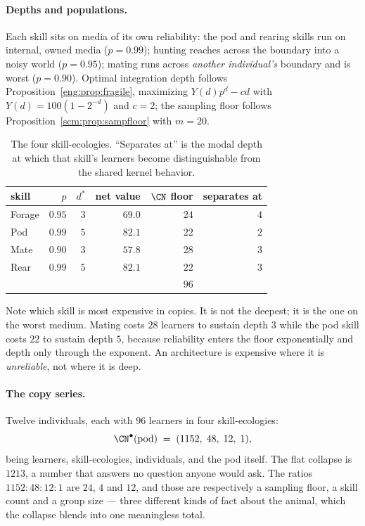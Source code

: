 \paragraph{Depths and populations.}
Each skill sits on media of its own reliability: the pod and rearing
skills run on internal, owned media ($p = 0.99$); hunting reaches across
the boundary into a noisy world ($p = 0.95$); mating runs across
\emph{another individual's} boundary and is worst ($p = 0.90$). Optimal
integration depth follows Proposition~\ref{eng:prop:fragile}, maximizing
$Y(d)p^{d} - cd$ with $Y(d) = 100(1-2^{-d})$ and $c = 2$; the sampling
floor follows Proposition~\ref{scm:prop:sampfloor} with $m = 20$.

\begin{table}[h]
\centering
\begin{tabular}{lrrrrr}
\toprule
skill & $p$ & $d^\ast$ & net value & $\CN$ floor & separates at \\
\midrule
Forage & $0.95$ & $3$ & $69.0$ & $24$ & $4$ \\
Pod    & $0.99$ & $5$ & $82.1$ & $22$ & $2$ \\
Mate   & $0.90$ & $3$ & $57.8$ & $28$ & $3$ \\
Rear   & $0.99$ & $5$ & $82.1$ & $22$ & $3$ \\
\midrule
       &        &     &        & $96$ & \\
\bottomrule
\end{tabular}
\caption{The four skill-ecologies. ``Separates at'' is the modal depth at
which that skill's learners become distinguishable from the shared kernel
behavior.}
\label{scm:tab:skills}
\end{table}

Note which skill is most expensive in copies. It is not the deepest; it is
the one on the worst medium. Mating costs $28$ learners to sustain depth
$3$ while the pod skill costs $22$ to sustain depth $5$, because
reliability enters the floor exponentially and depth only through the
exponent. An architecture is expensive where it is \emph{unreliable}, not
where it is deep.

\paragraph{The copy series.}
Twelve individuals, each with $96$ learners in four skill-ecologies:
\[
  \CN^{\bullet}(\text{pod}) \;=\; (1152,\; 48,\; 12,\; 1),
\]
being learners, skill-ecologies, individuals, and the pod itself. The flat
collapse is $1213$, a number that answers no question anyone would ask.
The ratios $1152 : 48 : 12 : 1$ are $24$, $4$ and $12$, and those are
respectively a sampling floor, a skill count and a group size --- three
different kinds of fact about the animal, which the collapse blends into
one meaningless total.

